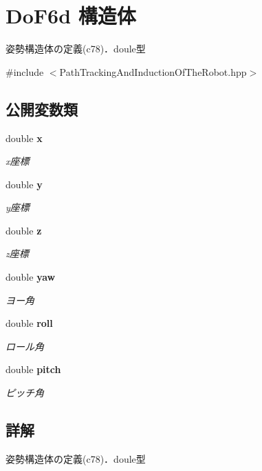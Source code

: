 \section{Do\-F6d 構造体}
\label{struct_do_f6d}


姿勢構造体の定義(c78)．doule型  




{\ttfamily \#include $<$Path\-Tracking\-And\-Induction\-Of\-The\-Robot.\-hpp$>$}

\subsection*{公開変数類}
\begin{DoxyCompactItemize}
\item 
double {\bf x}
\begin{DoxyCompactList}\small\item\em x座標 \end{DoxyCompactList}\item 
double {\bf y}
\begin{DoxyCompactList}\small\item\em y座標 \end{DoxyCompactList}\item 
double {\bf z}
\begin{DoxyCompactList}\small\item\em z座標 \end{DoxyCompactList}\item 
double {\bf yaw}
\begin{DoxyCompactList}\small\item\em ヨー角 \end{DoxyCompactList}\item 
double {\bf roll}
\begin{DoxyCompactList}\small\item\em ロール角 \end{DoxyCompactList}\item 
double {\bf pitch}
\begin{DoxyCompactList}\small\item\em ピッチ角 \end{DoxyCompactList}\end{DoxyCompactItemize}


\subsection{詳解}
姿勢構造体の定義(c78)．doule型 

